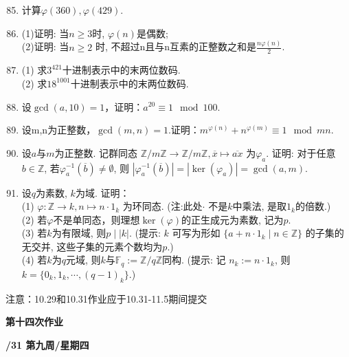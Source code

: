 \documentclass[a4paper,12pt]{article}
\begin{document}
\begin{enumerate}\setcounter{enumi}{84}

    \item 计算$\varphi(360),\varphi(429)$.
    
    \item (1)证明: 当$n\geq 3$时, $\varphi(n)$是偶数;\\
    (2)证明: 当$n\geq 2$ 时, 不超过n且与n互素的正整数之和是$\frac{n\varphi(n)}{2}$.
    
    \item (1) 求$3^{421}$十进制表示中的末两位数码.\\
          (2) 求$18^{1001}$十进制表示中的末两位数码.
    \item 设$\gcd(a,10)=1$，证明：$a^{20} \equiv 1 \mod 100$.

    
\item 设m,n为正整数，$\gcd(m,n)=1$.证明：$m^{\varphi(n)}+n^{\varphi(m)} \equiv 1 \mod mn$.

    \item 设$a$与$m$为正整数. 记群同态 $\mathbb Z/m\mathbb Z \rightarrow \mathbb Z/m\mathbb Z, \overline{x}\mapsto \overline{ax}$ 为$\varphi_a$. 证明: 
 对于任意$b\in \mathbb Z$, 若$\varphi_a^{-1}(\overline{b})\neq \emptyset$, 则 $|\varphi_a^{-1}(\overline{b})|=|\ker(\varphi_a)|=\gcd(a,m)$.




\item 设$q$为素数, $k$为域. 证明：\\
    (1) $\varphi\colon \mathbb Z\rightarrow k, n\mapsto n\cdot 1_k$ 为环同态. (注:此处$\cdot$ 不是$k$中乘法, 是取$1_k$的倍数.)\\
    (2) 若$\varphi$不是单同态，则理想$\ker(\varphi)$的正生成元为素数, 记为$p$. \\
    (3) 若$k$为有限域, 则$p\mid |k|$. (提示: $k$ 可写为形如 $\{a+n\cdot 1_k\mid n\in \mathbb Z\}$ 的子集的无交并, 这些子集的元素个数均为$p$.)\\
    (4) 若$k$为$q$元域, 则$k$与$\mathbb{F}_q:=\mathbb Z/q\mathbb Z$同构. (提示: 记 $n_k:=n\cdot 1_k$, 则 $k=\{0_k,1_k,\cdots, (q-1)_k\}$.)

\end{enumerate}

{\color{red} 注意：10.29和10.31作业应于10.31-11.5期间提交}

\newpage
\head

\begin{center} %
	{\Large \bf 第十四次作业} %
	\vspace{2mm}
	
	{\bf{}/31 \quad  第九周/星期四} %
\end{center} 
\end{document}
